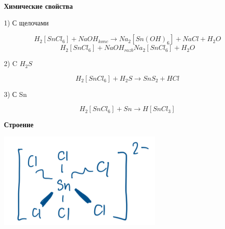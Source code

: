 \textbf{Химические свойства}

1) С щелочами

$$H_2[SnCl_6] + NaOH_{konc} \rightarrow Na_2[Sn(OH)_6] + NaCl + H_2O$$
$$H_2[SnCl_6] + NaOH_{razb} Na_2[SnCl_6] + H_2O$$

2) C $H_2S$

$$H_2[SnCl_6] + H_2S \rightarrow SnS_2 + HCl$$

3) С Sn

$$H_2[SnCl_6] + Sn \rightarrow H[SnCl_3]$$

\textbf{Строение}

\includegraphics{images/10v9.png}